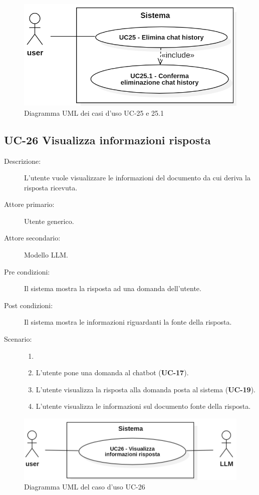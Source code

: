 \begin{figure}[H]
    \centering
    \includegraphics[width=0.9\linewidth]{UC25.PNG} 
    \caption{Diagramma UML dei casi d'uso UC-25 e 25.1}
\end{figure}

\subsection{UC-26 Visualizza informazioni risposta}
\begin{description}
    \item[Descrizione:] L'utente vuole visualizzare le informazioni del documento da cui deriva la risposta ricevuta.
    \item[Attore primario:] Utente generico.
    \item[Attore secondario:] Modello LLM.
    \item[Pre condizioni:] Il sistema mostra la risposta ad una domanda dell'utente.
    \item[Post condizioni:] Il sistema mostra le informazioni riguardanti la fonte della risposta.
    \item[Scenario:]
    \begin{enumerate}
        \item[]
        \item L’utente pone una domanda al chatbot (\textbf{UC-17}).
        \item L'utente visualizza la risposta alla domanda posta al sistema (\textbf{UC-19}).
        \item L'utente visualizza le informazioni sul documento fonte della risposta.
    \end{enumerate}
\end{description}

\begin{figure}[H]
    \centering
    \includegraphics[width=0.9\linewidth]{UC26.PNG}
    \caption{Diagramma UML del caso d'uso UC-26}
    \label{fig:UC32}
\end{figure}


